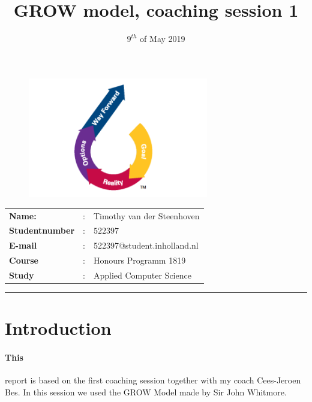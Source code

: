 \documentclass[11pt]{article}
\title{\huge \textbf{GROW model, coaching session 1}}
\date{$9^{th}$ of May 2019}
\begin{document}
	
	\thispagestyle{empty}
	
	\maketitle
	
	
	\begin{figure}[!h]
		\centering
		\includegraphics[width=0.7\textwidth]{GROW1}
		\label{fig:title}
	\end{figure}

\vspace{10mm}

		\begin{table}[!h]
		\centering
		\begin{tabular}{l c l}
			\textbf{Name:} & : & Timothy van der Steenhoven \\
				\textbf{Studentnumber} & : & $522397$ \\
				\textbf{E-mail} & : & 522397@student.inholland.nl \\
			\textbf{Course} & : & Honours Programm 1819\\
			\textbf{Study} &:& Applied Computer Science \\
			
		\end{tabular}	
	\end{table}

	\newpage
	
	\tableofcontents
	\vspace{10mm}
	\hrule
	
	\section*{Introduction}
	\paragraph{This} report is based on the first coaching session together with my coach Cees-Jeroen Bes. In this session we used the GROW Model made by Sir John Whitmore. 
	
\end{document}
